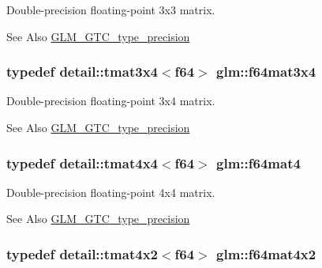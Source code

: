 Double-\/precision floating-\/point 3x3 matrix. 

\begin{DoxySeeAlso}{See Also}
\hyperlink{group__gtc__type__precision}{G\-L\-M\-\_\-\-G\-T\-C\-\_\-type\-\_\-precision} 
\end{DoxySeeAlso}
\hypertarget{group__gtc__type__precision_ga41bb7ff3c269ffae270d33acb3fcfae3}{
\subsubsection[{f64mat3x4}]{\setlength{\rightskip}{0pt plus 5cm}typedef detail\-::tmat3x4$<$f64$>$ {\bf glm\-::f64mat3x4}}}\label{group__gtc__type__precision_ga41bb7ff3c269ffae270d33acb3fcfae3}


Double-\/precision floating-\/point 3x4 matrix. 

\begin{DoxySeeAlso}{See Also}
\hyperlink{group__gtc__type__precision}{G\-L\-M\-\_\-\-G\-T\-C\-\_\-type\-\_\-precision} 
\end{DoxySeeAlso}
\hypertarget{group__gtc__type__precision_ga20a9c8bd28f6eb7ad10574e5f9068145}{
\subsubsection[{f64mat4}]{\setlength{\rightskip}{0pt plus 5cm}typedef detail\-::tmat4x4$<$f64$>$ {\bf glm\-::f64mat4}}}\label{group__gtc__type__precision_ga20a9c8bd28f6eb7ad10574e5f9068145}


Double-\/precision floating-\/point 4x4 matrix. 

\begin{DoxySeeAlso}{See Also}
\hyperlink{group__gtc__type__precision}{G\-L\-M\-\_\-\-G\-T\-C\-\_\-type\-\_\-precision} 
\end{DoxySeeAlso}
\hypertarget{group__gtc__type__precision_ga1097a920f29777c4220939e323377012}{
\subsubsection[{f64mat4x2}]{\setlength{\rightskip}{0pt plus 5cm}typedef detail\-::tmat4x2$<$f64$>$ {\bf glm\-::f64mat4x2}}}\label{group__gtc__type__precision_ga1097a920f29777c4220939e323377012}


